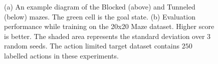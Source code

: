 \documentclass{article} %
\begin{document}
\begin{figure}
    \centering
     \hspace{2cm}
    \caption{(a) An example diagram of the Blocked (above) and Tunneled (below) mazes.  The green cell is the goal state. (b) Evaluation performance while training on the 20x20 Maze dataset. Higher score is better.  The shaded area represents the standard deviation over $3$ random seeds.  The action limited target dataset contains $250$ labelled actions in these experiments.}
    \label{fig:maze}
\end{figure}
\end{document}
